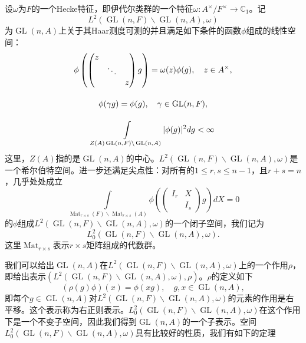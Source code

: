 设$\omega$为$F$的一个Hecke特征，即伊代尔类群的一个特征$\omega: A^\times / F^\times \rightarrow \mathbb{C}_1$。记
$$L^2\left( \operatorname{GL}(n,F)\backslash \operatorname{GL}(n,A), \omega \right)$$
为$\operatorname{GL}(n, A)$上关于其Haar测度\cite{ramakrishnan2005fourier}可测的并且满足如下条件的函数$\phi$组成的线性空间：
\begin{gather}
\label{eq:lin_sp1}
\phi \left( \begin{pmatrix} z & & \\ & \ddots & \\ & & z \end{pmatrix} g \right) = \omega(z)\phi(g), \quad z\in A^\times, \\[1em]
\label{eq:lin_sp2}
\phi(\gamma g) = \phi(g), \quad \gamma \in \operatorname{GL}(n,F), \\[1em]
\int\limits_{Z(A)\operatorname{GL}(n,F)\backslash \operatorname{GL}(n,A)} \lvert \phi(g) \rvert^2 dg < \infty \notag
\end{gather}
这里，$Z(A)$指的是$\operatorname{GL}(n, A)$的中心。$L^2\left( \operatorname{GL}(n,F)\backslash \operatorname{GL}(n,A), \omega \right)$是一个希尔伯特空间。进一步还满足尖点性：对所有的$1 \leqslant r,s \leqslant n-1$，且$r+s=n$，几乎处处成立
\begin{equation}
\label{eq:cusp_cond}
\int\limits_{\operatorname{Mat}_{r\times s}(F) \backslash \operatorname{Mat}_{r\times s}(A)} \phi \left( \begin{pmatrix} I_r & X \\ & I_s \end{pmatrix} g \right) dX = 0
\end{equation}
的$\phi$组成$L^2\left( \operatorname{GL}(n,F)\backslash \operatorname{GL}(n,A), \omega \right)$的一个闭子空间，我们记为
$$L^2_0\left( \operatorname{GL}(n,F)\backslash \operatorname{GL}(n,A), \omega \right).$$
这里$\operatorname{Mat}_{r\times s}$表示$r\times s$矩阵组成的代数群。

我们可以给出$\operatorname{GL}(n,A)$在$L^2\left( \operatorname{GL}(n,F)\backslash \operatorname{GL}(n,A), \omega \right)$上的一个作用$\rho$，即给出表示$\left( L^2\left( \operatorname{GL}(n,F)\backslash \operatorname{GL}(n,A), \omega \right), \rho \right)$。$\rho$的定义如下
$$
(\rho(g)\phi)(x) = \phi(xg), \quad g,x \in \operatorname{GL}(n,A),
$$
即每个$g\in \operatorname{GL}(n,A)$对$L^2\left( \operatorname{GL}(n,F)\backslash \operatorname{GL}(n,A), \omega \right)$的元素的作用是右平移。这个表示称为右正则表示。$L^2_0\left( \operatorname{GL}(n,F)\backslash \operatorname{GL}(n,A), \omega \right)$在这个作用下是一个不变子空间，因此我们得到$\operatorname{GL}(n,A)$的一个子表示。空间$L^2_0\left( \operatorname{GL}(n,F)\backslash \operatorname{GL}(n,A), \omega \right)$具有比较好的性质，我们有如下的定理

